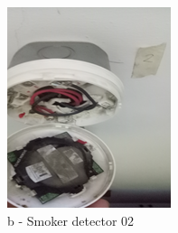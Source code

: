 \begin{figure}[h]
\begin{minipage}[b]{0.22\linewidth}
		\includegraphics[width=\textwidth]{figures/ch05_fdas_sd02}
		\caption*{b - Smoker detector 02}
	\end{minipage}
	\hspace{0.03cm}
	\begin{minipage}[b]{0.22\linewidth}
		\centering

\end{minipage}
\end{figure}
